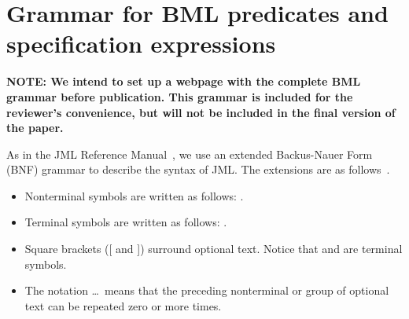 \section{Grammar for BML predicates and specification expressions}\label{AppBML}\InsertLabelMaybe

\textbf{NOTE: We intend to set up a webpage with the complete BML grammar 
before publication. This grammar is included for the reviewer's
convenience, but will not be included in the final version of the
paper.}

As in the JML Reference Manual~\cite{JMLReferenceManual05}, we use an
extended Backus-Nauer Form (BNF) grammar to describe the syntax of
JML. The extensions are as follows~\cite{Ledgard80}.

\begin{itemize}
\item Nonterminal symbols are written as follows: .

\item Terminal symbols are written as follows: .

\item Square brackets ([ and ]) surround optional text. Notice that
\codeHook{[} and \codeHook{]} are terminal symbols.  

\item The notation \dots\ means that the preceding nonterminal or group of optional text can be repeated zero or more times.  
\end{itemize}

